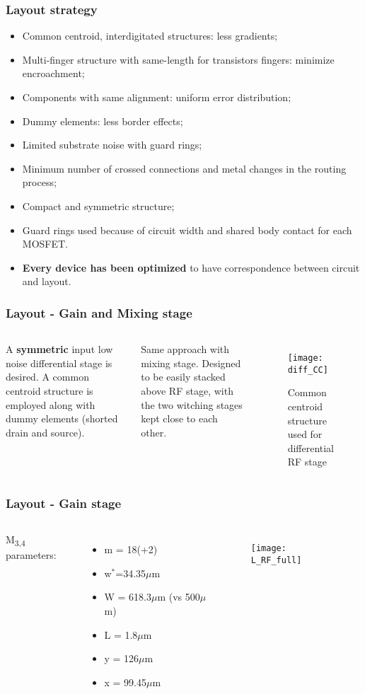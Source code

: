 \begin{frame}
	\frametitle{Layout strategy}
	\begin{itemize}
		\item Common centroid, interdigitated structures: less gradients;
		\item Multi-finger structure with same-length for transistors fingers: minimize encroachment;
		\item Components with same alignment: uniform error distribution;
		\item Dummy elements: less border effects;
		\item Limited substrate noise with guard rings;
		\item Minimum number of crossed connections and metal changes in the routing process;
		\item Compact and symmetric structure;
		\item Guard rings used because of circuit width and shared body contact for each MOSFET.
		\item \textbf{Every device has been optimized} to have correspondence between circuit and layout.  
	\end{itemize}
\end{frame}

\begin{frame}
	\frametitle{Layout - Gain and Mixing stage}
	\begin{columns}
		A \textbf{symmetric} input low noise differential stage is desired.
		A common centroid structure is employed along with dummy elements (shorted drain and source).
		
		Same approach with mixing stage. Designed to be easily stacked above RF stage, with the two witching stages kept close to each other.
		\begin{figure}[H]
			\centering
			\texttt{[image: diff\_CC]}
			\caption{Common centroid structure used for differential RF stage}
			\label{fig:diff_CC}
		\end{figure}
	\end{columns}
\end{frame}

\begin{frame}
	\frametitle{Layout - Gain stage}
	\begin{columns}
		\column{0.3\textwidth}
		M\textsubscript{3,4} parameters:
			\begin{itemize}
				\item m = 18(+2)
				\item w$^*$=34.35$\mu$m
				\item W = 618.3$\mu$m (vs 500$\mu$m)
				\item L = 1.8$\mu$m
				\item y = 126$\mu$m
				\item x = 99.45$\mu$m
			\end{itemize}
		\column{0.7\textwidth}
		\begin{figure}[H]
			\centering
			\texttt{[image: L\_RF\_full]}
			\label{L_RF_full}
		\end{figure}
	\end{columns}
\end{frame}


